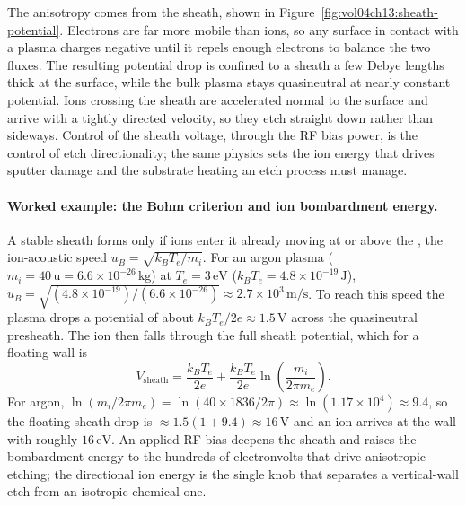 

The anisotropy comes from the sheath, shown in
Figure~\ref{fig:vol04ch13:sheath-potential}. Electrons are far more mobile
than ions, so any surface in contact with a plasma charges negative until
it repels enough electrons to balance the two fluxes. The resulting
potential drop is confined to a sheath a few Debye lengths thick at the
surface, while the bulk plasma stays quasineutral at nearly constant
potential. Ions crossing the sheath are accelerated normal to the surface
and arrive with a tightly directed velocity, so they etch straight down
rather than sideways. Control of the sheath voltage, through the RF bias
power, is the control of etch directionality; the same physics sets the
ion energy that drives sputter damage and the substrate heating an etch
process must manage.

\paragraph{Worked example: the Bohm criterion and ion bombardment energy.}
A stable sheath forms only if ions enter it already moving at or above the
, the ion-acoustic speed $u_{B} = \sqrt{k_{B}T_e/
m_i}$. For an argon plasma ($m_i = 40\,\text{u} = 6.6\times 10^{-26}\,\si{
\kilogram}$) at $T_e = 3\,\si{\electronvolt}$ ($k_{B}T_e = 4.8\times
10^{-19}\,\si{\joule}$), $u_{B} = \sqrt{(4.8\times 10^{-19})/(6.6\times
10^{-26})} \approx 2.7\times 10^{3}\,\si{\meter\per\second}$. To reach this
speed the plasma drops a potential of about $k_{B}T_e/2e \approx 1.5\,\si{
\volt}$ across the quasineutral presheath. The ion then falls through the
full sheath potential, which for a floating wall is
\[
V_{\mathrm{sheath}} = \frac{k_{B}T_e}{2e}
+ \frac{k_{B}T_e}{2e}\ln\!\left(\frac{m_i}{2\pi m_e}\right).
\]
For argon, $\ln(m_i/2\pi m_e) = \ln(40\times 1836/2\pi) \approx \ln(1.17
\times 10^{4}) \approx 9.4$, so the floating sheath drop is $\approx
1.5(1 + 9.4) \approx 16\,\si{\volt}$ and an ion arrives at the wall with
roughly $16\,\si{\electronvolt}$. An applied RF bias deepens the sheath and
raises the bombardment energy to the hundreds of electronvolts that drive
anisotropic etching; the directional ion energy is the single knob that
separates a vertical-wall etch from an isotropic chemical one.

